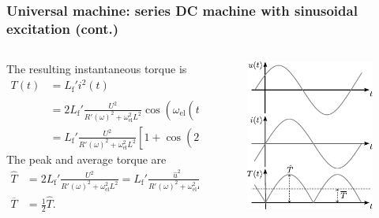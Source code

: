 \begin{frame}
	\frametitle{Universal machine: series DC machine with sinusoidal excitation (cont.)}
	\begin{columns}
		\begin{column}{0.55\textwidth}
		The resulting instantaneous torque is
		\begin{equation*}
		\begin{split}
			T(t) &= L_\mathrm{f}' i^2(t)\\
				 &= 2L_\mathrm{f}'\frac{U^2}{R'(\omega)^2+\omega_\mathrm{el}^2L^2}\cos\left(\omega_\mathrm{el}(t-\frac{L}{R'(\omega)})\right)^2\\
				 &= L_\mathrm{f}'\frac{U^2}{R'(\omega)^2+\omega_\mathrm{el}^2L^2}\left[1+\cos\left(2\omega_\mathrm{el}(t-\frac{L}{R'(\omega)})\right)\right].	
		\end{split}
	\end{equation*}
	The peak and average torque are
	\begin{equation}
		\begin{split}
		\hat{T} &= 2 L_\mathrm{f}'\frac{U^2}{R'(\omega)^2+\omega_\mathrm{el}^2L^2}= L_\mathrm{f}'\frac{\hat{u}^2}{R'(\omega)^2+\omega_\mathrm{el}^2L^2}, \\
		\overline{T} &= \frac{1}{2}\hat{T}.
	\end{split}
	\label{eq:Universal_motor_peak_avg_torque}
\end{equation}
	\end{column}
\hfill
\begin{column}{0.45\textwidth}
	\begin{figure}
		\centering
		\includegraphics[scale=1.05]{fig/lec03/Universal_machine_time_signals.pdf}
	\end{figure}
\end{column}
\end{columns}
\end{frame}

